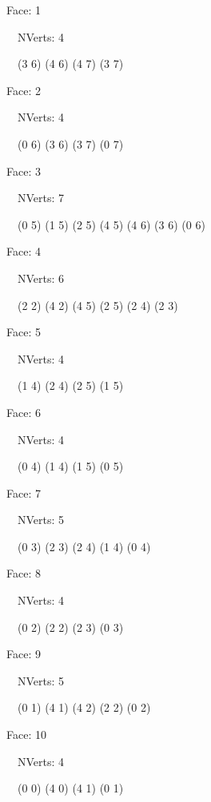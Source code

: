\documentclass{article}
\begin{document}
{\footnotesize 

Face: 1

\   \    NVerts: 4

 \   \   (3 6) (4 6) (4 7) (3 7)}

{\footnotesize 

Face: 2

\   \    NVerts: 4

 \   \   (0 6) (3 6) (3 7) (0 7)}

{\footnotesize 

Face: 3

\   \    NVerts: 7

 \   \   (0 5) (1 5) (2 5) (4 5) (4 6) (3 6) (0 6)}

{\footnotesize 

Face: 4

\   \    NVerts: 6

 \   \   (2 2) (4 2) (4 5) (2 5) (2 4) (2 3)}

{\footnotesize 

Face: 5

\   \    NVerts: 4

 \   \   (1 4) (2 4) (2 5) (1 5)}

{\footnotesize 

Face: 6

\   \    NVerts: 4

 \   \   (0 4) (1 4) (1 5) (0 5)}

{\footnotesize 

Face: 7

\   \    NVerts: 5

 \   \   (0 3) (2 3) (2 4) (1 4) (0 4)}

{\footnotesize 

Face: 8

\   \    NVerts: 4

 \   \   (0 2) (2 2) (2 3) (0 3)}

{\footnotesize 

Face: 9

\   \    NVerts: 5

 \   \   (0 1) (4 1) (4 2) (2 2) (0 2)}

{\footnotesize 

Face: 10

\   \    NVerts: 4

 \   \   (0 0) (4 0) (4 1) (0 1)}


 \newpage
\end{document}
